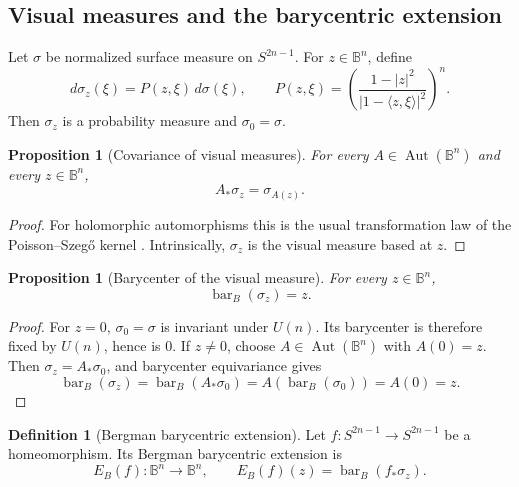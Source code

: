 \documentclass[11pt]{article}
\newtheorem{proposition}[theorem]{Proposition}
\theoremstyle{definition}
\newtheorem{definition}[theorem]{Definition}
\theoremstyle{remark}
\theoremstyle{definition}
\newcommand{\B}{\mathbb B}
\newcommand{\Aut}{\operatorname{Aut}}
\newcommand{\barB}{\operatorname{bar}_{B}}
\begin{document}
\subsection{Visual measures and the barycentric extension}

Let \(\sigma\) be normalized surface measure on \(S^{2n-1}\).  For
\(z\in\B^n\), define
\begin{equation}\label{visual-measure}
        d\sigma_z(\xi)=P(z,\xi)\,d\sigma(\xi),
        \qquad
        P(z,\xi)=
        \left(\frac{1-|z|^2}{|1-\langle z,\xi\rangle|^2}\right)^n.
\end{equation}
Then \(\sigma_z\) is a probability measure and \(\sigma_0=\sigma\).

\begin{proposition}[Covariance of visual measures]\label{visual-covariance}
For every \(A\in\Aut(\B^n)\) and every \(z\in\B^n\),
\begin{equation}\label{visual-covariance-equation}
        A_*\sigma_z=\sigma_{A(z)}.
\end{equation}
\end{proposition}

\begin{proof}
For holomorphic automorphisms this is the usual transformation law of the
Poisson--Szeg\H{o} kernel \cite{Rudin}. Intrinsically, \(\sigma_z\) is the
visual measure based at \(z\).
\end{proof}

\begin{proposition}[Barycenter of the visual measure]\label{visual-barycenter}
For every \(z\in\B^n\),
\begin{equation}\label{bar-visual}
        \barB(\sigma_z)=z.
\end{equation}
\end{proposition}

\begin{proof}
For \(z=0\), \(\sigma_0=\sigma\) is invariant under \(U(n)\).  Its barycenter
is therefore fixed by \(U(n)\), hence is \(0\).  If \(z\ne0\), choose
\(A\in\Aut(\B^n)\) with \(A(0)=z\).  Then \(\sigma_z=A_*\sigma_0\), and
barycenter equivariance gives
\[
        \barB(\sigma_z)=\barB(A_*\sigma_0)=A(\barB(\sigma_0))=A(0)=z.
\]
\end{proof}

\begin{definition}[Bergman barycentric extension]\label{extension-definition}
Let \(f:S^{2n-1}\to S^{2n-1}\) be a homeomorphism.  Its Bergman barycentric
extension is
\[
        E_B(f):\B^n\to\B^n,
        \qquad
        E_B(f)(z)=\barB(f_*\sigma_z).
\]
\end{definition}
\end{document}
